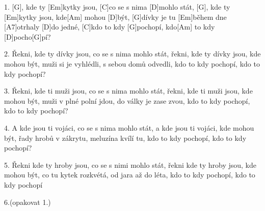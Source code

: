 
1. [G], kde ty [Em]kytky jsou, [C]co se s nima [D]mohlo stát,
[G], kde ty [Em]kytky jsou, kde[Am] mohou [D]být,
[G]dívky je tu [Em]během dne [A7]otrhaly [D]do jedné,
[C]kdo to kdy [G]pochopí, kdo[Am] to kdy [D]pocho[G]pí?

2. Řekni, kde ty dívky jsou, co se s nima mohlo stát,
řekni, kde ty dívky jsou, kde mohou být,
muži si je vyhlédli, s sebou domů odvedli,
kdo to kdy pochopí, kdo to kdy pochopí?

3. Řekni, kde ti muži jsou, co se s nima mohlo stát,
řekni, kde ti muži jsou, kde mohou být,
muži v plné polní jdou, do války je zase zvou,
kdo to kdy pochopí, kdo to kdy pochopí?

4. A kde jsou ti vojáci, co se s nima mohlo stát,
a kde jsou ti vojáci, kde mohou být,
řady hrobů v zákrytu, meluzína kvílí tu,
kdo to kdy pochopí, kdo to kdy pochopí?

5. Řekni kde ty hroby jsou, co se s nimi mohlo stát,
řekni kde ty hroby jsou, kde mohou být,
co tu kytek rozkvétá, od jara až do léta,
kdo to kdy pochopí, kdo to kdy pochopí


6.(opakovat 1.)